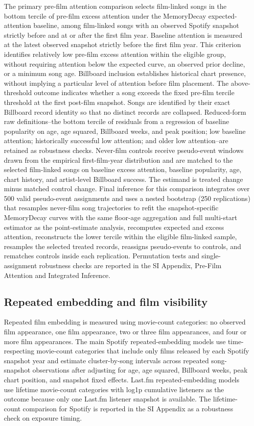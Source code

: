 \documentclass[10pt]{article}
\begin{document}
The primary pre-film attention comparison selects film-linked songs in the bottom tercile of pre-film excess attention under the MemoryDecay expected-attention baseline, among film-linked songs with an observed Spotify snapshot strictly before and at or after the first film year. Baseline attention is measured at the latest observed snapshot strictly before the first film year. This criterion identifies relatively low pre-film excess attention within the eligible group, without requiring attention below the expected curve, an observed prior decline, or a minimum song age. Billboard inclusion establishes historical chart presence, without implying a particular level of attention before film placement. The above-threshold outcome indicates whether a song exceeds the fixed pre-film tercile threshold at the first post-film snapshot. Songs are identified by their exact Billboard record identity so that no distinct records are collapsed. Reduced-form raw definitions--the bottom tercile of residuals from a regression of baseline popularity on age, age squared, Billboard weeks, and peak position; low baseline attention; historically successful low attention; and older low attention--are retained as robustness checks. Never-film controls receive pseudo-event windows drawn from the empirical first-film-year distribution and are matched to the selected film-linked songs on baseline excess attention, baseline popularity, age, chart history, and artist-level Billboard success. The estimand is treated change minus matched control change. Final inference for this comparison integrates over 500 valid pseudo-event assignments and uses a nested bootstrap (250 replications) that resamples never-film song trajectories to refit the snapshot-specific MemoryDecay curves with the same floor-age aggregation and full multi-start estimator as the point-estimate analysis, recomputes expected and excess attention, reconstructs the lower tercile within the eligible film-linked sample, resamples the selected treated records, reassigns pseudo-events to controls, and rematches controls inside each replication. Permutation tests and single-assignment robustness checks are reported in the SI Appendix, Pre-Film Attention and Integrated Inference.

\subsection*{Repeated embedding and film visibility}

Repeated film embedding is measured using movie-count categories: no observed film appearance, one film appearance, two or three film appearances, and four or more film appearances. The main Spotify repeated-embedding models use time-respecting movie-count categories that include only films released by each Spotify snapshot year and estimate cluster-by-song intervals across repeated song-snapshot observations after adjusting for age, age squared, Billboard weeks, peak chart position, and snapshot fixed effects. Last.fm repeated-embedding models use lifetime movie-count categories with log1p cumulative listeners as the outcome because only one Last.fm listener snapshot is available. The lifetime-count comparison for Spotify is reported in the SI Appendix as a robustness check on exposure timing.
\end{document}
